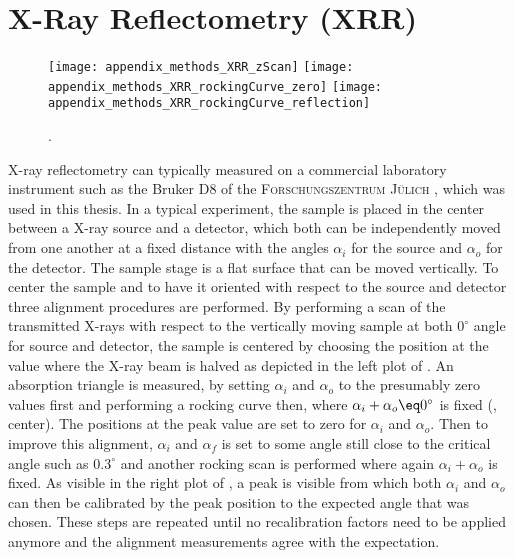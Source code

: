 \documentclass[\main/dresen_thesis.tex]{subfiles}
\begin{document}
  \section{X-Ray Reflectometry (XRR)}
    \label{app:methods:xrr}
    \begin{figure}[tb]
      \centering
      \texttt{[image: appendix\_methods\_XRR\_zScan]}
      \texttt{[image: appendix\_methods\_XRR\_rockingCurve\_zero]}
      \texttt{[image: appendix\_methods\_XRR\_rockingCurve\_reflection]}
      \caption{\label{fig:appendix:methods:xrr:alignment}.}
    \end{figure}

    X-ray reflectometry can typically measured on a commercial laboratory instrument such as the Bruker D8 of the \textsc{Forschungszentrum J\"ulich} , which was used in this thesis.
    In a typical experiment, the sample is placed in the center between a X-ray source and a detector, which both can be independently moved from one another at a fixed distance with the angles $\alpha_i$ for the source and $\alpha_o$ for the detector.
    The sample stage is a flat surface that can be moved vertically.
    To center the sample and to have it oriented with respect to the source and detector three alignment procedures are performed.
    By performing a scan of the transmitted X-rays with respect to the vertically moving sample at both $0^\circ$ angle for source and detector, the sample is centered by choosing the position at the value where the X-ray beam is halved as depicted in the left plot of .
    An absorption triangle is measured, by setting $\alpha_i$ and $\alpha_o$ to the presumably zero values first and performing a rocking curve then, where $\alpha_i + \alpha_o \eq 0^\circ$ is fixed (, center).
    The positions at the peak value are set to zero for $\alpha_i$ and $\alpha_o$.
    Then to improve this alignment, $\alpha_i$ and $\alpha_f$ is set to some angle still close to the critical angle such as $0.3^\circ$ and another rocking scan is performed where again $\alpha_i + \alpha_o$ is fixed.
    As visible in the right plot of , a peak is visible from which both $\alpha_i$ and $\alpha_o$ can then be calibrated by the peak position to the expected angle that was chosen.
    These steps are repeated until no recalibration factors need to be applied anymore and the alignment measurements agree with the expectation.
\end{document}
